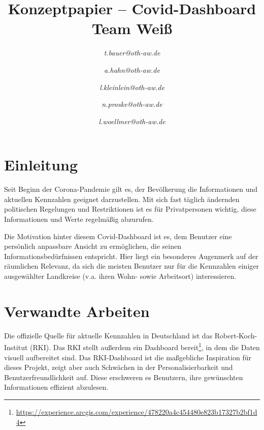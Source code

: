 \documentclass[conference]{IEEEtran}
\begin{document}
\title{Konzeptpapier -- Covid-Dashboard\\
{\footnotesize Team Weiß}}
\author{
\textit{t.bauer@oth-aw.de}
\and
{}
\textit{a.hahn@oth-aw.de}
\and
{}
\textit{l.kleinlein@oth-aw.de}
\and
{}
\textit{n.proske@oth-aw.de}
\and
{}
\textit{l.woellmer@oth-aw.de}
}

\maketitle

\begin{abstract}
    
\end{abstract}

\begin{IEEEkeywords}
\end{IEEEkeywords}

\section{Einleitung}
Seit Beginn der Corona-Pandemie gilt es, der Bevölkerung die Informationen und aktuellen Kennzahlen geeignet darzustellen. Mit sich fast täglich ändernden politischen Regelungen und Restriktionen ist es für Privatpersonen wichtig, diese Informationen und Werte regelmäßig abzurufen.

Die Motivation hinter diesem Covid-Dashboard ist es, dem Benutzer eine persönlich anpassbare Ansicht zu ermöglichen, die seinen Informationsbedürfnissen entspricht. Hier liegt ein besonderes Augenmerk auf der räumlichen Relevanz, da sich die meisten Benutzer nur für die Kennzahlen einiger ausgewählter Landkreise (v.a. ihren Wohn- sowie Arbeitsort) interessieren.

\section{Verwandte Arbeiten}
Die offizielle Quelle für aktuelle Kennzahlen in Deutschland ist das Robert-Koch-Institut (RKI). Das RKI stellt außerdem ein Dashboard bereit\footnote{\url{https://experience.arcgis.com/experience/478220a4c454480e823b17327b2bf1d4}}, in dem die Daten visuell aufbereitet sind. Das RKI-Dashboard ist die maßgebliche Inspiration für dieses Projekt, zeigt aber auch Schwächen in der Personalisierbarkeit und Benutzerfreundlichkeit auf. Diese erschweren es Benutzern, ihre gewünschten Informationen effizient abzulesen.
\end{document}
